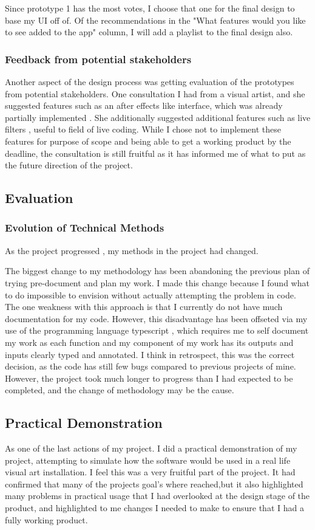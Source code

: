 \documentclass{article}
\begin{document}
Since prototype  1  has the most votes, I choose that one for the final design to base my UI off of.
Of the recommendations in the "What features would you like to see added to the app" column, I will add a playlist to the final design also. 
\subsubsection{Feedback from potential stakeholders}
Another aspect of the design process was getting evaluation of the prototypes from potential stakeholders. One consultation I had from a visual artist, and she suggested features such as an after effects like interface, which was already partially implemented . She additionally suggested additional features such as live filters \cite{visart}, useful to field of live coding. While I chose not to implement these features for purpose of scope and being able to get a working product by the deadline, the consultation is still fruitful as it has informed me of what to put as the future direction of the project. 
\subsection{Evaluation}

\subsubsection{Evolution of Technical Methods}
As the project progressed , my methods in the project had changed. 

The biggest change to my methodology has been abandoning the previous plan of trying pre-document and plan my work. I made this change because I found what to do impossible to envision without actually attempting the problem in code. The one weakness with this approach is that I currently do not have much documentation for my code. However, this disadvantage has been offseted via my use of the programming language typescript , which requires me to self document my work as each function and my component of my work has its outputs and inputs clearly typed and annotated. I think in retrospect, this was the correct decision, as the code has still few bugs compared to previous projects of mine. However, the project took much longer to progress  than I had expected to be completed, and the change of methodology may be the cause.

\subsection{Practical Demonstration} 
As one of the last actions of my project. I did a practical demonstration of my project, attempting to simulate how the software would be used in a real life visual art installation. I feel this was a very fruitful part of the project. It had confirmed that many of the projects goal's where reached,but it also highlighted many problems in practical usage that I had overlooked at the design stage of the product, and highlighted to me changes I needed to make to ensure that I had a fully working product.
\end{document}
